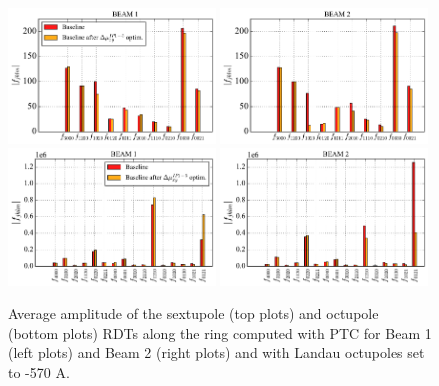\documentclass{cernatsnote}
\begin{document}
\begin{figure}[h!]
\centering
\includegraphics[width=0.49\textwidth]{images/rdt_sext_base_b1_570_ca.pdf} \hfill \includegraphics[width=0.49\textwidth]{images/rdt_sext_base_b2_570_ca.pdf} \\
\includegraphics[width=0.49\textwidth]{images/rdt_oct_base_b1_570_ca.pdf} \hfill \includegraphics[width=0.49\textwidth]{images/rdt_oct_base_b2_570_ca.pdf}
\caption{\label{rdt_base} Average amplitude of the sextupole (top plots) and octupole (bottom plots) RDTs along the ring computed with PTC for Beam 1 (left plots) and Beam 2 (right plots) and with Landau octupoles set to -570 A.}
\end{figure}
\end{document}
